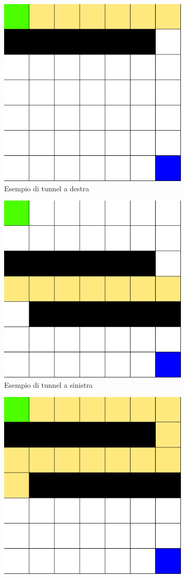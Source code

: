 \begin{figure}[H]
	\centering
	\begin{subfigure}{.33\textwidth}
		\centering
		\includegraphics[width=.7\textwidth]{img/tunneldx.png}
		\caption{Esempio di tunnel a destra}
	\end{subfigure}%
	\begin{subfigure}{.33\textwidth}
		\centering
		\includegraphics[width=.7\textwidth]{img/tunnelsx.png}
		\caption{Esempio di tunnel a sinistra}
	\end{subfigure}%
	\begin{subfigure}{.33\textwidth}
		\centering
		\includegraphics[width=.7\textwidth]{img/tunneldxsx.png}

\end{subfigure}
\end{figure}
